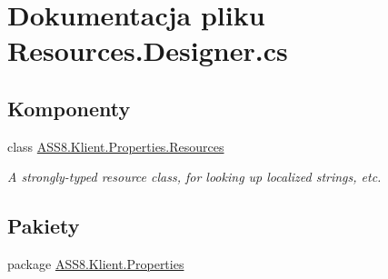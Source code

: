 \hypertarget{a00051}{
\section{Dokumentacja pliku Resources.Designer.cs}
\label{d2/d79/a00051}
}
\subsection*{Komponenty}
\begin{CompactItemize}
\item 
class \hyperlink{a00022}{ASS8.Klient.Properties.Resources}
\begin{CompactList}\small\item\em A strongly-typed resource class, for looking up localized strings, etc. \item\end{CompactList}\end{CompactItemize}
\subsection*{Pakiety}
\begin{CompactItemize}
\item 
package \hyperlink{a00061}{ASS8.Klient.Properties}
\end{CompactItemize}
